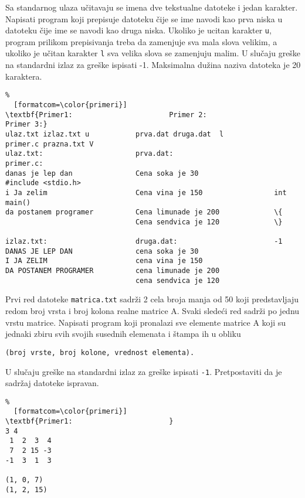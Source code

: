 \documentclass{article}
\begin{document}
\begin{z}
Sa standarnog ulaza u\v citavaju se imena dve tekstualne datoteke i
jedan karakter.  Napisati program koji prepisuje datoteku \v cije se
ime navodi kao prva niska u datoteku \v cije ime se navodi kao
druga niska. Ukoliko je ucitan karakter \verb|u|, program prilikom
prepisivanja treba da zamenjuje sva mala slova velikim, a ukoliko je
u\v citan karakter \verb|l| sva velika slova se zamenjuju malim. U
slu\v caju greške na standardni izlaz za greške ispisati -1.  Maksimalna du\v
zina naziva datoteka je 20 karaktera.
\end{z}
\begin{Verbatim}%
  [formatcom=\color{primeri}]
\textbf{Primer1:                       Primer 2:                        Primer 3:}
ulaz.txt izlaz.txt u           prva.dat druga.dat  l            primer.c prazna.txt V       
ulaz.txt:                      prva.dat:                        primer.c:
danas je lep dan               Cena soka je 30                  #include <stdio.h>
i Ja zelim                     Cena vina je 150                 int main()
da postanem programer          Cena limunade je 200             \{
                               Cena sendvica je 120             \}
                               
izlaz.txt:                     druga.dat:                       -1                               
DANAS JE LEP DAN               cena soka je 30
I JA ZELIM                     cena vina je 150
DA POSTANEM PROGRAMER          cena limunade je 200
                               cena sendvica je 120
\end{Verbatim}                         

\begin{z}
Prvi red datoteke \verb|matrica.txt| sadr\v zi 2 cela broja manja od
50 koji predstavljaju redom broj vrsta i broj kolona realne matrice
A. Svaki slede\'ci red sadr\v zi po jednu vrstu matrice. Napisati
program koji pronalazi sve elemente matrice A koji su jednaki zbiru
svih svojih susednih elemenata i \v stampa ih u obliku
\begin{verbatim}
(broj vrste, broj kolone, vrednost elementa).
\end{verbatim}
 U slučaju greške na standardni izlaz za greške ispisati {\tt -1}.
Pretpostaviti da je sadr\v zaj datoteke ispravan. 
\end{z}
\begin{Verbatim}%
  [formatcom=\color{primeri}]
\textbf{Primer1:                       }
3 4
 1  2  3  4
 7  2 15 -3
-1  3  1  3

(1, 0, 7)
(1, 2, 15)
\end{Verbatim}
\end{document}
